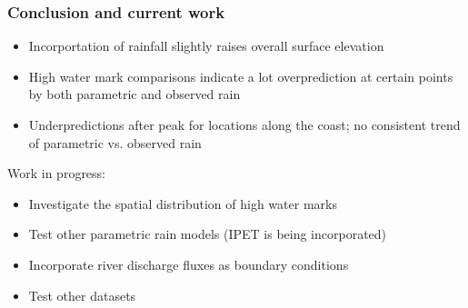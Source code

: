 \documentclass[10pt]{oden_beamer}
\begin{document}
\begin{frame}
  \frametitle{Conclusion and current work}
  \begin{itemize}
  \item Incorportation of rainfall slightly raises overall surface elevation
  \item High water mark comparisons indicate a lot overprediction at certain points by both parametric and observed rain
  \item Underpredictions after peak for locations along the coast; no consistent trend of parametric vs. observed rain
  \end{itemize}
  Work in progress:
  \begin{itemize}
  \item Investigate the spatial distribution of high water marks
  \item Test other parametric rain models (IPET is being incorporated)
  \item Incorporate river discharge fluxes as boundary conditions
  \item Test other datasets
  \end{itemize}
\end{frame}
\end{document}
